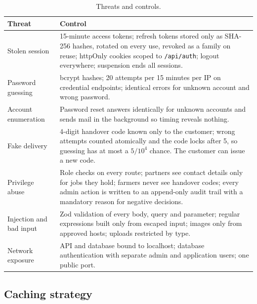 \documentclass[11pt,a4paper]{article}
\begin{document}
\begin{table}[H]\centering\small
\begin{tabularx}{\linewidth}{@{}p{3.3cm}L@{}}
\toprule
\textbf{Threat} & \textbf{Control} \\
\midrule
Stolen session & 15-minute access tokens; refresh tokens stored only as SHA-256 hashes, rotated on every use, revoked as a family on reuse; httpOnly cookies scoped to \texttt{/api/auth}; logout everywhere; suspension ends all sessions. \\
Password guessing & bcrypt hashes; 20 attempts per 15 minutes per IP on credential endpoints; identical errors for unknown account and wrong password. \\
Account enumeration & Password reset answers identically for unknown accounts and sends mail in the background so timing reveals nothing. \\
Fake delivery & 4-digit handover code known only to the customer; wrong attempts counted atomically and the code locks after 5, so guessing has at most a $5/10^4$ chance. The customer can issue a new code. \\
Privilege abuse & Role checks on every route; partners see contact details only for jobs they hold; farmers never see handover codes; every admin action is written to an append-only audit trail with a mandatory reason for negative decisions. \\
Injection and bad input & Zod validation of every body, query and parameter; regular expressions built only from escaped input; images only from approved hosts; uploads restricted by type. \\
Network exposure & API and database bound to localhost; database authentication with separate admin and application users; one public port. \\
\bottomrule
\end{tabularx}
\caption{Threats and controls.}
\end{table}

\subsection{Caching strategy}
\end{document}
